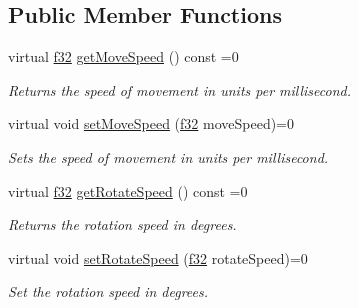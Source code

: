 \subsection*{Public Member Functions}
\begin{DoxyCompactItemize}
\item 
\mbox{\label{classirr_1_1scene_1_1ISceneNodeAnimatorCameraFPS_ad6a4eda64fd3ba984f3adf479f89078b}} 
virtual \hyperlink{namespaceirr_a0277be98d67dc26ff93b1a6a1d086b07}{f32} \hyperlink{classirr_1_1scene_1_1ISceneNodeAnimatorCameraFPS_ad6a4eda64fd3ba984f3adf479f89078b}{get\+Move\+Speed} () const =0
\begin{DoxyCompactList}\small\item\em Returns the speed of movement in units per millisecond. \end{DoxyCompactList}\item 
\mbox{\label{classirr_1_1scene_1_1ISceneNodeAnimatorCameraFPS_a0f9a2f2742a4f7f19bcbba22d7803e96}} 
virtual void \hyperlink{classirr_1_1scene_1_1ISceneNodeAnimatorCameraFPS_a0f9a2f2742a4f7f19bcbba22d7803e96}{set\+Move\+Speed} (\hyperlink{namespaceirr_a0277be98d67dc26ff93b1a6a1d086b07}{f32} move\+Speed)=0
\begin{DoxyCompactList}\small\item\em Sets the speed of movement in units per millisecond. \end{DoxyCompactList}\item 
virtual \hyperlink{namespaceirr_a0277be98d67dc26ff93b1a6a1d086b07}{f32} \hyperlink{classirr_1_1scene_1_1ISceneNodeAnimatorCameraFPS_ab8ef30073df3084712346e1a84be6a9e}{get\+Rotate\+Speed} () const =0
\begin{DoxyCompactList}\small\item\em Returns the rotation speed in degrees. \end{DoxyCompactList}\item 
\mbox{\label{classirr_1_1scene_1_1ISceneNodeAnimatorCameraFPS_aa2aa1cda142b9221dc702c0d740c1467}} 
virtual void \hyperlink{classirr_1_1scene_1_1ISceneNodeAnimatorCameraFPS_aa2aa1cda142b9221dc702c0d740c1467}{set\+Rotate\+Speed} (\hyperlink{namespaceirr_a0277be98d67dc26ff93b1a6a1d086b07}{f32} rotate\+Speed)=0
\begin{DoxyCompactList}\small\item\em Set the rotation speed in degrees. \end{DoxyCompactList}\item 

\end{DoxyCompactItemize}
